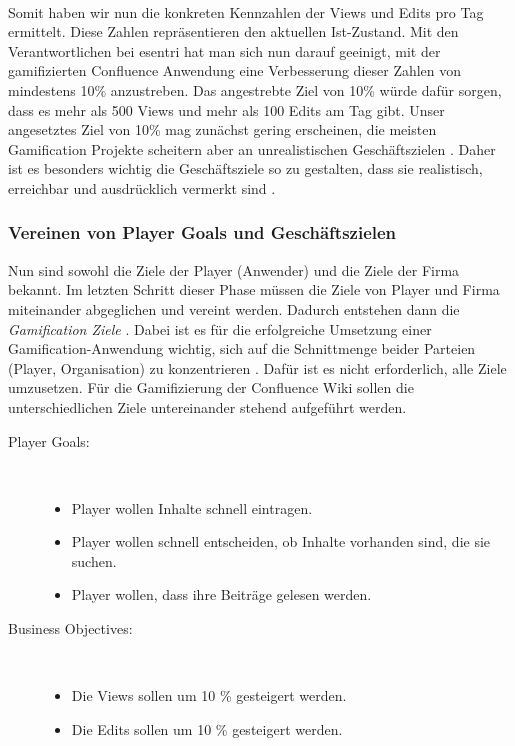 \documentclass[a4paper,12pt,twoside]{scrartcl}
\begin{document}
\\
Somit haben wir nun die konkreten Kennzahlen der Views und Edits pro Tag ermittelt. Diese Zahlen repräsentieren den aktuellen Ist-Zustand. Mit den Verantwortlichen bei esentri hat man sich nun darauf geeinigt, mit der gamifizierten Confluence Anwendung eine Verbesserung dieser Zahlen von mindestens 10\% anzustreben. Das angestrebte Ziel von 10\% würde dafür sorgen, dass es mehr als 500 Views und mehr als 100 Edits am Tag gibt. Unser angesetztes Ziel von 10\% mag zunächst gering erscheinen, die meisten Gamification Projekte scheitern aber an unrealistischen Geschäftszielen \cite{gamificationDefinition}. Daher ist es besonders wichtig die Geschäftsziele so zu gestalten, dass sie realistisch, erreichbar und ausdrücklich vermerkt sind \cite{gamificationDefinition}.

\subsubsection{Vereinen von Player Goals und Geschäftszielen}
\label{Gamification Ziele}
Nun sind sowohl die Ziele der Player (Anwender) und die Ziele der Firma bekannt. Im letzten Schritt dieser Phase müssen die Ziele von Player und Firma miteinander abgeglichen und vereint werden. Dadurch entstehen dann die \textit{Gamification Ziele} \cite{gamificationDefinition}. Dabei ist es für die erfolgreiche Umsetzung einer Gamification-Anwendung wichtig, sich auf die Schnittmenge beider Parteien (Player, Organisation) zu konzentrieren \cite{gamificationDefinition}. Dafür ist es nicht erforderlich, alle Ziele umzusetzen. Für die Gamifizierung der Confluence Wiki sollen die unterschiedlichen Ziele untereinander stehend aufgeführt werden.
\begin{description}
   \item[Player Goals:]~\par
   \begin{itemize}
      \item Player wollen Inhalte schnell eintragen. 
      \item Player wollen schnell entscheiden, ob Inhalte vorhanden sind, die sie suchen.
      \item Player wollen, dass ihre Beiträge gelesen werden.
   \end{itemize}
\end{description} 
\begin{description}
   \item[Business Objectives:]~\par
   \begin{itemize}
      \item Die Views sollen um 10 \% gesteigert werden. 
      \item Die Edits sollen um 10 \% gesteigert werden.
   \end{itemize}
\end{description}
\end{document}
